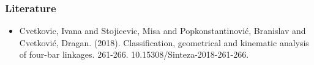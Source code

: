 \documentclass[ucs,10pt]{beamer}
\begin{document}
\begin{frame}
\frametitle{Literature}
	\begin{itemize}
		\item Cvetkovic, Ivana and Stojicevic, Misa and Popkonstantinović, Branislav and Cvetković, Dragan. (2018). Classification, geometrical and kinematic analysis of four-bar linkages. 261-266. 10.15308/Sinteza-2018-261-266.
	\end{itemize}
\end{frame}
\end{document}
